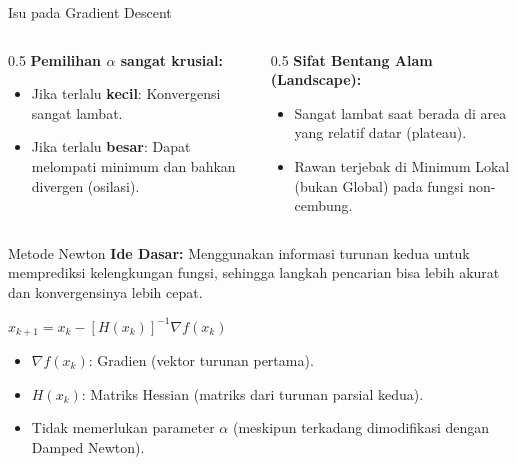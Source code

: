 \documentclass[aspectratio=169]{beamer}
\begin{document}
\begin{frame}{Isu pada Gradient Descent}
    \begin{columns}
        \begin{column}{0.5\textwidth}
            \textbf{Pemilihan $\alpha$ sangat krusial:}
            \begin{itemize}
                \item Jika terlalu \textbf{kecil}: Konvergensi sangat lambat.
                \item Jika terlalu \textbf{besar}: Dapat melompati minimum dan bahkan divergen (osilasi).
            \end{itemize}
        \end{column}
        \begin{column}{0.5\textwidth}
            \textbf{Sifat Bentang Alam (Landscape):}
            \begin{itemize}
                \item Sangat lambat saat berada di area yang relatif datar (plateau).
                \item Rawan terjebak di Minimum Lokal (bukan Global) pada fungsi non-cembung.
            \end{itemize}
        \end{column}
    \end{columns}
\end{frame}

\begin{frame}{Metode Newton}
    \textbf{Ide Dasar:} Menggunakan informasi turunan kedua untuk memprediksi kelengkungan fungsi, sehingga langkah pencarian bisa lebih akurat dan konvergensinya lebih cepat.
    \vspace{0.3cm}
    \begin{tcolorbox}[colback=yellow!5,colframe=UNIBYellow,title=Aturan Pembaruan Metode Newton]
        $x_{k+1} = x_k - [H(x_k)]^{-1} \nabla f(x_k)$
    \end{tcolorbox}
    \begin{itemize}
        \item $\nabla f(x_k)$: Gradien (vektor turunan pertama).
        \item $H(x_k)$: Matriks Hessian (matriks dari turunan parsial kedua).
        \item Tidak memerlukan parameter $\alpha$ (meskipun terkadang dimodifikasi dengan Damped Newton).
    \end{itemize}
\end{frame}
\end{document}
